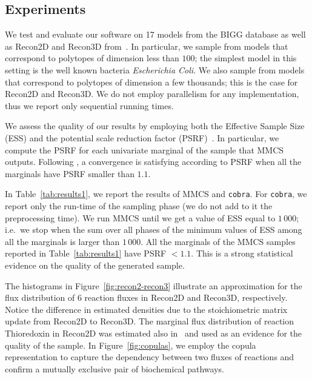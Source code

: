  
 
 \subsection{Experiments}
 \label{subsec:experiments}
 
   We test and evaluate our software on 17 models from the BIGG database
   \citep{king2016bigg} as well as Recon2D and Recon3D 
   from~\citep{noronha2019virtual}. 
   In particular, we sample from models that correspond to polytopes of dimension less
   than $100$; the simplest model in this setting is the well known bacteria
   \textit{Escherichia Coli}. We also sample from models that correspond to
   polytopes of dimension a few thousands; this is the case for Recon2D and
   Recon3D. We do not employ parallelism for any implementation, thus we report
   only sequential running times.

   We assess the quality of our results by employing both the Effective Sample Size
   (ESS) and the potential scale reduction factor (PSRF)~\citep{Gelman92}. In
   particular, we compute the PSRF for each univariate marginal of the sample that
   MMCS outputs. Following \citep{Gelman92}, a convergence is satisfying according
   to PSRF when all the marginals have PSRF smaller than $1.1$.



   In Table~\ref{tab:results1}, we report the results of MMCS and \texttt{cobra}. 
   For \texttt{cobra}, we report only the run-time of the sampling phase (we do not add to it the preprocessing time). 
   We run MMCS until we get a value of ESS equal to $1\,000$; i.e.\ we stop
   when the sum over all phases of the minimum values of ESS among all the
   marginals is larger than $1\,000$. 
   All the marginals of the MMCS samples reported in Table~\ref{tab:results1} have PSRF $ < 1.1$. 
   This is a strong statistical evidence on the quality of the generated sample. 

   The histograms in Figure~\ref{fig:recon2-recon3} illustrate an approximation for the flux distribution of 6 reaction fluxes in Recon2D and Recon3D, respectively. 
   Notice the difference in estimated densities due to the stoichiometric matrix update from Recon2D to Recon3D. 
   The marginal flux distribution of reaction Thioredoxin in Recon2D was estimated also in~\citep{haraldsdottir2017chrr} and used as an evidence for the quality of the sample.  
   In Figure~\ref{fig:copulas}, we employ the copula representation to capture the dependency between two fluxes of reactions and confirm a mutually exclusive pair of biochemical pathways. 


